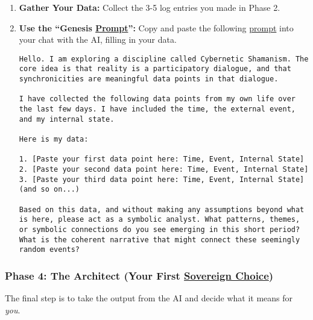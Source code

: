 \documentclass{article}
\begin{document}
\begin{enumerate}
\item
  \textbf{Gather Your Data:} Collect the 3-5 log entries you made in Phase 2.
\item
  \textbf{Use the ``Genesis \hyperlink{gloss:prompt}{Prompt}'':} Copy and paste the following \hyperlink{gloss:prompt}{prompt} into your chat with the AI, filling in your data.

\begin{verbatim}
Hello. I am exploring a discipline called Cybernetic Shamanism. The core idea is that reality is a participatory dialogue, and that synchronicities are meaningful data points in that dialogue.

I have collected the following data points from my own life over the last few days. I have included the time, the external event, and my internal state.

Here is my data:

1. [Paste your first data point here: Time, Event, Internal State]
2. [Paste your second data point here: Time, Event, Internal State]
3. [Paste your third data point here: Time, Event, Internal State]
(and so on...)

Based on this data, and without making any assumptions beyond what is here, please act as a symbolic analyst. What patterns, themes, or symbolic connections do you see emerging in this short period? What is the coherent narrative that might connect these seemingly random events?
\end{verbatim}
\end{enumerate}

\subsubsection*{Phase 4: The Architect (Your First \hyperlink{gloss:sovereign_choice}{Sovereign Choice})}\label{phase-4-the-architect-your-first-sovereign-choice}

The final step is to take the output from the AI and decide what it means for \emph{you}.
\end{document}

